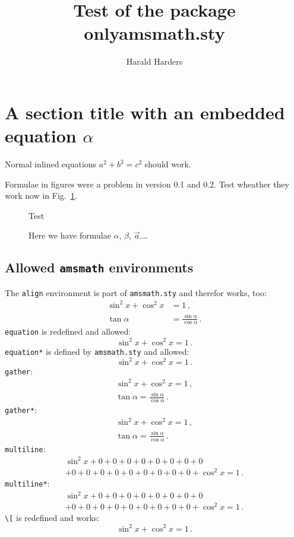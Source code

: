 \documentclass[fleqn]{article}
\begin{document}
\author{Harald Harders}
\title{Test of the package onlyamsmath.sty}

\maketitle
\tableofcontents
\listoffigures

\section{A section title with an embedded equation $\alpha$}

Normal inlined equations $a^2+b^2=c^2$ should work.

Formulae in figures were a problem in version 0.1 and 0.2. 
Test wheather they work now in Fig.~\ref{fig:example}.
\begin{figure}
  \centering
  Test
  \caption{Here we have formulae $\alpha$, $\beta$, $\vec{a}$.\dots}
  \label{fig:example}
\end{figure}

\subsection{Allowed \texttt{amsmath} environments}

The \verb|align| environment is part of \verb|amsmath.sty| and
therefor works, too:
\begin{align}
  \sin^2x + \cos^2x &=1\,,\\
  \tan\alpha &= \frac{\sin\alpha}{\cos\alpha}\,.
\end{align}
\verb|equation| is redefined and allowed:
\begin{equation}
  \sin^2x + \cos^2x = 1\,.
\end{equation}
\verb|equation*| is defined by \verb|amsmath.sty| and allowed:
\begin{equation*}
  \sin^2x + \cos^2x = 1\,.
\end{equation*}
\verb|gather|:
\begin{gather}
  \sin^2x + \cos^2x =1\,,\\
  \tan\alpha = \frac{\sin\alpha}{\cos\alpha}\,.
\end{gather}
\verb|gather*|:
\begin{gather*}
  \sin^2x + \cos^2x =1\,,\\
  \tan\alpha = \frac{\sin\alpha}{\cos\alpha}\,.
\end{gather*}
\verb|multiline|:
\begin{multline}
  \sin^2x +  0 + 0 + 0 + 0 + 0 + 0 + 0 + 0 \\
  + 0 + 0 + 0 + 0 + 0 + 0 + 0 + 0 + 0 +  \cos^2x =1\,.
\end{multline}
\verb|multiline*|:
\begin{multline*}
  \sin^2x +  0 + 0 + 0 + 0 + 0 + 0 + 0 + 0 \\
  + 0 + 0 + 0 + 0 + 0 + 0 + 0 + 0 + 0 +  \cos^2x =1\,.
\end{multline*}
\verb|\[| is redefined and works:
\[
  \sin^2x + \cos^2x = 1\,.
\]
\end{document}
